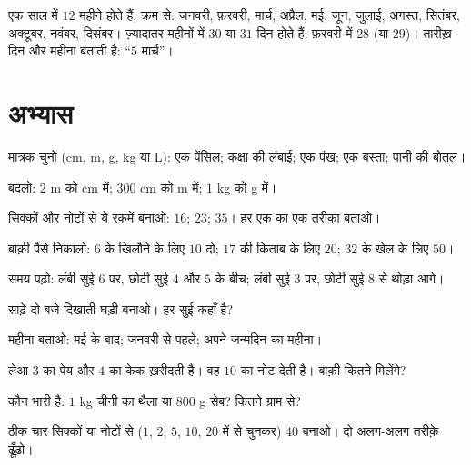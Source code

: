 \begin{example}[कैलेंडर]\label{ex:g2:measure:calendar}
एक साल में $12$ महीने होते हैं, क्रम से: जनवरी, फ़रवरी, मार्च,
अप्रैल, मई, जून, जुलाई, अगस्त, सितंबर, अक्टूबर, नवंबर, दिसंबर।
ज़्यादातर महीनों में $30$ या $31$ दिन होते हैं; फ़रवरी में $28$
(या $29$)। तारीख़ दिन और महीना बताती है: ``$5$ मार्च''।
\end{example}

\section{अभ्यास}

\begin{exercise}[$\star$]\label{exo:g2:measure:1}
मात्रक चुनो (cm, m, g, kg या L): एक पेंसिल; कक्षा की
लंबाई; एक पंख; एक बस्ता; पानी की बोतल।
\end{exercise}

\begin{exercise}[$\star$]\label{exo:g2:measure:2}
बदलो: $2$ m को cm में; $300$ cm को m में; $1$ kg को g में।
\end{exercise}

\begin{exercise}[$\star$]\label{exo:g2:measure:3}
सिक्कों और नोटों से ये रक़में बनाओ: $16$; \quad $23$; \quad
$35$। हर एक का एक तरीक़ा बताओ।
\end{exercise}

\begin{exercise}[$\star$]\label{exo:g2:measure:4}
बाक़ी पैसे निकालो: $6$ के खिलौने के लिए $10$ दो; $17$ की किताब
के लिए $20$; $32$ के खेल के लिए $50$।
\end{exercise}

\begin{exercise}[$\star$]\label{exo:g2:measure:5}
समय पढ़ो: लंबी सुई $6$ पर, छोटी सुई $4$ और $5$ के बीच;
लंबी सुई $3$ पर, छोटी सुई $8$ से थोड़ा आगे।
\end{exercise}

\begin{exercise}[$\star$]\label{exo:g2:measure:6}
साढ़े दो बजे दिखाती घड़ी बनाओ। हर सुई कहाँ है?
\end{exercise}

\begin{exercise}[$\star$]\label{exo:g2:measure:7}
महीना बताओ: मई के बाद; जनवरी से पहले; अपने जन्मदिन का
महीना।
\end{exercise}

\begin{exercise}[$\star$]\label{exo:g2:measure:8}
लेआ $3$ का पेय और $4$ का केक ख़रीदती है। वह $10$ का नोट देती
है। बाक़ी कितने मिलेंगे?
\end{exercise}

\begin{exercise}[$\star$]\label{exo:g2:measure:9}
कौन भारी है: $1$ kg चीनी का थैला या $800$ g सेब? कितने ग्राम
से?
\end{exercise}

\begin{exercise}[$\star\star$]\label{exo:g2:measure:10}
ठीक चार सिक्कों या नोटों से ($1$, $2$, $5$, $10$, $20$ में से
चुनकर) $40$ बनाओ। दो अलग-अलग तरीक़े ढूँढ़ो।
\end{exercise}
